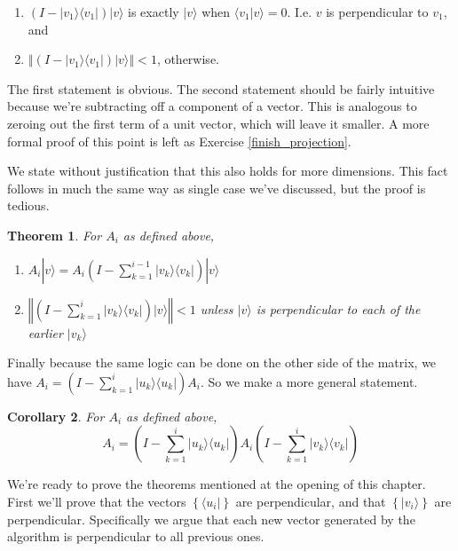 \documentclass{amsbook}
\newtheorem{theorem}{Theorem}
\newtheorem{corollary}[theorem]{Corollary}
\begin{document}
\begin{enumerate}
\item  $\left(I-| v _1\rangle\langle v _1|\right)| v \rangle$ is exactly $| v \rangle$ when $\langle v _1| v \rangle=0$.  I.e. $ v $ is perpendicular to $ v _1$, and 
\item  $\left\Vert\left(I-| v _1\rangle\langle v _1|\right)| v \rangle\right\Vert < 1$, otherwise.
\end{enumerate}

The first statement is obvious.  The second statement should be fairly intuitive because we're subtracting off a component of a vector.  This is analogous to zeroing out the first term of a unit vector, which will leave it smaller.  A more formal proof of this point is left as Exercise \ref{finish_projection}.

We state without justification that this also holds for more dimensions.  This fact follows in much the same way as single case we've discussed, but the proof is tedious.

 \begin{theorem}
\label{lil_projection_thm}
For $A_i$ as defined above,
\begin{enumerate}
\item $A_i| v \rangle=A_i\left(I-\sum_{k=1}^{i-1}| v _k\rangle\langle v _k|\right)| v \rangle$
\item $\left\Vert\left(I-\sum_{k=1}^{i}| v _k\rangle\langle v _k|\right)| v \rangle\right\Vert<1$ unless $| v \rangle$ is perpendicular to each of the earlier $| v _k\rangle$
\end{enumerate}
 \end{theorem}

Finally because the same logic can be done on the other side of the matrix, we have $A_i=\left(I-\sum_{k=1}^i| u _k\rangle\langle u _k|\right)A_i$.  So we make a more general statement.

\begin{corollary}
\label{double_side_proj}
For $A_i$ as defined above,
$$
A_i=\left(I-\sum_{k=1}^i| u _k\rangle\langle u _k|\right)A_i\left(I-\sum_{k=1}^{i}| v _k\rangle\langle v _k|\right)
$$
\end{corollary}

We're ready to prove the theorems mentioned at the opening of this chapter.  First we'll prove that the vectors $\left\{\langle u_i|\right\}$ are perpendicular, and that $\left\{|v_i\rangle\right\}$ are perpendicular.  Specifically we argue that each new vector generated by the algorithm is perpendicular to all previous ones.
\end{document}

